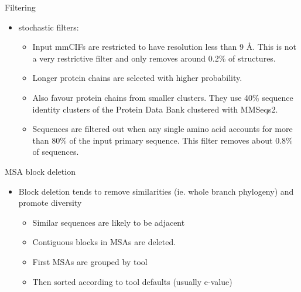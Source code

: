 \documentclass[presentation, smaller]{beamer}
\begin{document}
\begin{frame}[label={sec:org2cedb7f}]{Filtering \cite{jumperHighlyAccurateProtein2021}}
\begin{itemize}
\item stochastic filters: 
\begin{itemize}
\item Input mmCIFs are restricted to have resolution less than 9 Å. This is not a very restrictive filter and only removes around 0.2\% of structures.
\item Longer protein chains are selected with higher probability.
\item Also favour protein chains from smaller clusters. They use 40\% sequence identity clusters of the Protein Data Bank clustered with MMSeqs2.
\item Sequences are filtered out when any single amino acid accounts for more than 80\% of the input primary sequence. This filter removes about 0.8\% of sequences.
\end{itemize}
\end{itemize}
\end{frame}

\begin{frame}[label={sec:orgabc0ac2}]{MSA block deletion \cite{jumperHighlyAccurateProtein2021}}
\begin{itemize}
\item Block deletion tends to remove similarities (ie. whole branch phylogeny) and promote diversity
\begin{itemize}
\item Similar sequences are likely to be adjacent
\item Contiguous blocks in MSAs are deleted.
\item First MSAs are grouped by tool
\item Then sorted according to tool defaults (usually e-value)
\end{itemize}
\end{itemize}
\end{frame}
\end{document}
